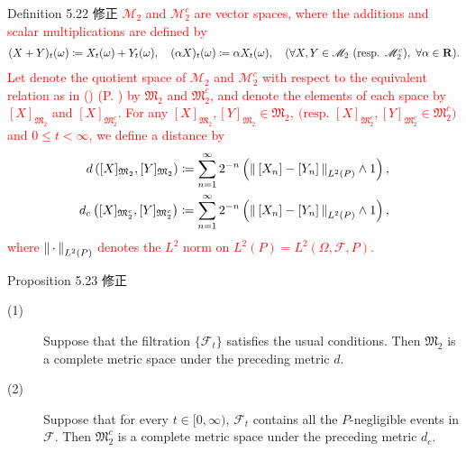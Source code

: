 	\begin{itembox}[l]{Definition 5.22 修正}
		\textcolor{red}{$\mathscr{M}_2$ and $\mathscr{M}_2^c$ are vector spaces, 
		where the additions and scalar multiplications are defined by
		\begin{align}
			(X+Y)_t(\omega) \coloneqq X_t(\omega) + Y_t(\omega),
			\quad (\alpha X)_t(\omega) \coloneqq \alpha X_t(\omega),
			\quad (\forall X,Y \in \mathscr{M}_2\ \mbox{(resp. $\mathscr{M}_2^c$)},\ \forall \alpha \in \mathbf{R}).
		\end{align}
		Let denote the quotient space of $\mathscr{M}_2$ and $\mathscr{M}_2^c$ with respect to
		the equivalent relation as in ()
		(P. \pageref{eq:equivalence_with_respect_to_path}) by $\mathfrak{M}_2$ and $\mathfrak{M}_2^c$,
		and denote the elements of each space by $[X]_{\mathfrak{M}_2}$ and  $[X]_{\mathfrak{M}_2^c}$.
		For any $[X]_{\mathfrak{M}_2},[Y]_{\mathfrak{M}_2} \in \mathfrak{M}_2,\ 
		\mbox{(resp. $[X]_{\mathfrak{M}_2^c},[Y]_{\mathfrak{M}_2^c} \in \mathfrak{M}_2^c$)}$
		and $0 \leq t < \infty$, we define a distance by
		\begin{align}
			d\left([X]_{\mathfrak{M}_2},[Y]_{\mathfrak{M}_2}\right)
			&\coloneqq \sum_{n=1}^\infty 2^{-n}\left(\left\|\, [X_n] - [Y_n]\, \right\|_{L^2(P)} \wedge 1\right), \\
			d_c\left([X]_{\mathfrak{M}_2^c},[Y]_{\mathfrak{M}_2^c}\right)
			&\coloneqq \sum_{n=1}^\infty 2^{-n}\left(\left\|\, [X_n] - [Y_n]\, \right\|_{L^2(P)} \wedge 1\right),
		\end{align}
		where $\left\|\, \cdot\, \right\|_{L^2(P)}$ denotes the $L^2$ norm on $L^2(P) = L^2(\Omega,\mathscr{F},P)$.}
	\end{itembox}
	
	\begin{itembox}[l]{Proposition 5.23 修正}
		\begin{description}
			\item[(1)]
				Suppose that the filtration $\{\mathscr{F}_t\}$ satisfies the usual conditions.
				Then $\mathfrak{M}_2$ is a complete metric space under the preceding metric $d$.
			\item[(2)]
				Suppose that for every $t \in [0,\infty)$,
				$\mathscr{F}_t$ contains all the $P$-negligible events in $\mathscr{F}$.
				Then $\mathfrak{M}_2^c$ is a complete metric space under the preceding metric $d_c$.
		\end{description}
	\end{itembox}
	
